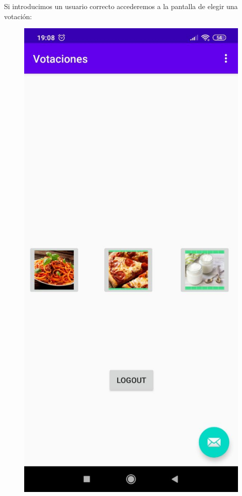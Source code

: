 \documentclass{article}
\begin{document}
 	Si introducimos un usuario correcto accederemos a la pantalla de elegir una votación:
 	\begin{figure}[H]
 		\centering
 		\includegraphics[totalheight=8cm]{img/android4}
 	\end{figure}
\end{document}
